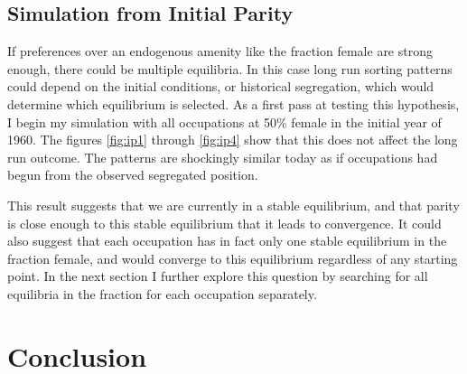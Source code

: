 \documentclass[12pt]{article}
\begin{document}
\subsection{Simulation from Initial Parity}
If preferences over an endogenous amenity like the fraction female are strong enough, there could be multiple equilibria. In this case long run sorting patterns could depend on the initial conditions, or historical segregation, which would determine which equilibrium is selected. As a first pass at testing this hypothesis, I begin my simulation with all occupations at 50\% female in the initial year of 1960. The figures \ref{fig:ip1} through \ref{fig:ip4} show that this does not affect the long run outcome. The patterns are shockingly similar today as if occupations had begun from the observed segregated position. 

This result suggests that we are currently in a stable equilibrium, and that parity is close enough to this stable equilibrium that it leads to convergence. It could also suggest that each occupation has in fact only one stable equilibrium in the fraction female, and would converge to this equilibrium regardless of any starting point. In the next section I further explore this question by searching for all equilibria in the fraction for each occupation separately.


\section{Conclusion}






\end{document}
